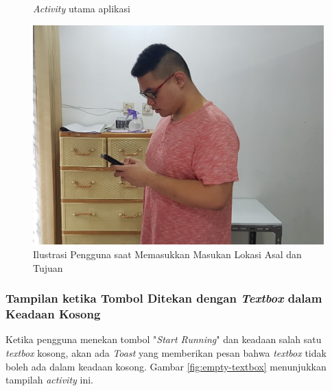 \begin{figure}
  \caption{\textit{Activity} utama aplikasi}
  \label{fig:main-page}
\endminipage\hfill
{}
  \includegraphics[width=\linewidth]{Gambar/richard-input.jpg}
  \caption{Ilustrasi Pengguna saat Memasukkan Masukan Lokasi Asal dan Tujuan}
  \label{fig:user-main-page}
\endminipage\hfill
\end{figure}


\subsubsection{Tampilan ketika Tombol Ditekan dengan \textit{Textbox} dalam Keadaan Kosong}
Ketika pengguna menekan tombol "\textit{Start Running}" dan keadaan salah satu \textit{textbox} kosong, akan ada \textit{Toast} yang memberikan pesan bahwa \textit{textbox} tidak boleh ada dalam keadaan kosong. Gambar \ref{fig:empty-textbox} menunjukkan tampilah \textit{activity} ini.

